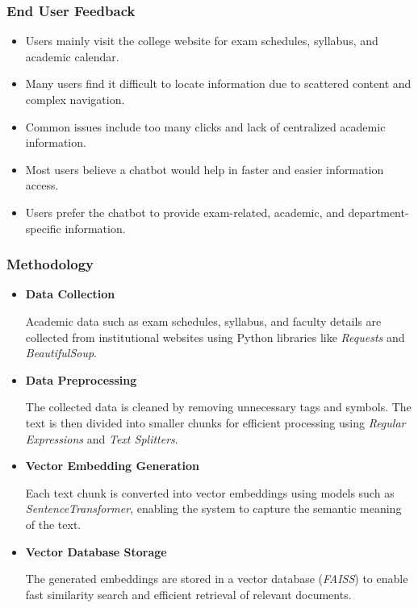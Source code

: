 \documentclass[10pt,aspectratio=1610]{beamer}
\begin{document}

\begin{frame}
\frametitle{End User Feedback}

\begin{itemize}
    \item Users mainly visit the college website for exam schedules, syllabus, and academic calendar.
    \item Many users find it difficult to locate information due to scattered content and complex navigation.
    \item Common issues include too many clicks and lack of centralized academic information.
    \item Most users believe a chatbot would help in faster and easier information access.
    \item Users prefer the chatbot to provide exam-related, academic, and department-specific information.
\end{itemize}

\end{frame}



\begin{frame}
\frametitle{Methodology}

\begin{itemize}

\item \textbf{Data Collection}

Academic data such as exam schedules, syllabus, and faculty details are collected from institutional websites using Python libraries like \textit{Requests} and \textit{BeautifulSoup}.

\item \textbf{Data Preprocessing}

The collected data is cleaned by removing unnecessary tags and symbols. The text is then divided into smaller chunks for efficient processing using \textit{Regular Expressions} and \textit{Text Splitters}.

\item \textbf{Vector Embedding Generation}

Each text chunk is converted into vector embeddings using models such as \textit{SentenceTransformer}, enabling the system to capture the semantic meaning of the text.

\item \textbf{Vector Database Storage}

The generated embeddings are stored in a vector database (\textit{FAISS}) to enable fast similarity search and efficient retrieval of relevant documents.

\end{itemize}

\end{frame}
\end{document}
